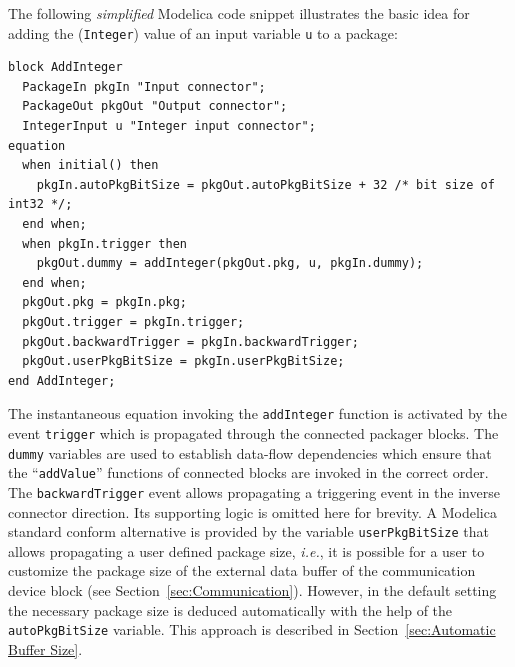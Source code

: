\documentclass{resources/modelica}
\newcommand{\modelica}[1]{\lstinline[language=modelica]|#1|}
\begin{document}
The
following \emph{simplified} Modelica code snippet illustrates the basic idea for
adding the (\modelica{Integer}) value of an input variable \modelica{u} to a package:
\begin{lstlisting}[language=modelica]
block AddInteger
  PackageIn pkgIn "Input connector";
  PackageOut pkgOut "Output connector";
  IntegerInput u "Integer input connector";
equation
  when initial() then
    pkgIn.autoPkgBitSize = pkgOut.autoPkgBitSize + 32 /* bit size of int32 */;
  end when;
  when pkgIn.trigger then
    pkgOut.dummy = addInteger(pkgOut.pkg, u, pkgIn.dummy);
  end when;
  pkgOut.pkg = pkgIn.pkg;
  pkgOut.trigger = pkgIn.trigger;
  pkgOut.backwardTrigger = pkgIn.backwardTrigger;
  pkgOut.userPkgBitSize = pkgIn.userPkgBitSize;
end AddInteger;
\end{lstlisting}
The instantaneous equation invoking the \modelica{addInteger} function is
activated by the event \modelica{trigger} which is propagated through the connected packager blocks.
The \modelica{dummy} variables are used to establish data-flow dependencies
which ensure that the ``\modelica{addValue}'' functions of connected
blocks are invoked in the correct order. The \modelica{backwardTrigger} event
allows propagating a triggering event in the inverse connector direction.
Its supporting logic is omitted here for brevity. A Modelica standard conform alternative is provided by the
variable \modelica{userPkgBitSize} that allows propagating a user defined package size, \textit{i.e.}, it is possible for a
user to customize the package size of the external data buffer of the communication device block (see
Section~\ref{sec:Communication}). However,
in the default setting the necessary package size is deduced automatically
with the help of the \modelica{autoPkgBitSize} variable. This approach is
described in Section~\ref{sec:Automatic Buffer Size}.
\end{document}
